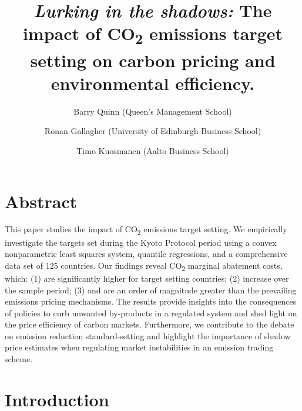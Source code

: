 \documentclass[
  letterpaper,
  DIV=11,
  numbers=noendperiod]{scrartcl}
\title{\emph{Lurking in the shadows:} The impact of CO\textsubscript{2}
emissions target setting on carbon pricing and environmental
efficiency.}
\author{Barry Quinn (Queen's Management School) \and Ronan Gallagher
(University of Edinburgh Business School) \and Timo Kuosmanen (Aalto
Business School)}
\date{}
\begin{document}
\maketitle

\ifdefined\Shaded\renewenvironment{Shaded}{\begin{tcolorbox}[enhanced, sharp corners, borderline west={3pt}{0pt}{shadecolor}, breakable, interior hidden, frame hidden, boxrule=0pt]}{\end{tcolorbox}}\fi

\hypertarget{abstract}{%
\section{Abstract}\label{abstract}}

This paper studies the impact of CO\textsubscript{2} emissions target
setting. We empirically investigate the targets set during the Kyoto
Protocol period using a convex nonparametric least squares system,
quantile regressions, and a comprehensive data set of 125 countries. Our
findings reveal CO\textsubscript{2} marginal abatement costs, which: (1)
are significantly higher for target setting countries; (2) increase over
the sample period; (3) and are an order of magnitude greater than the
prevailing emissions pricing mechanisms. The results provide insights
into the consequences of policies to curb unwanted by-products in a
regulated system and shed light on the price efficiency of carbon
markets. Furthermore, we contribute to the debate on emission reduction
standard-setting and highlight the importance of shadow price estimates
when regulating market instabilities in an emission trading scheme.

\newpage

\hypertarget{introduction}{%
\section{Introduction}\label{introduction}}
\end{document}
